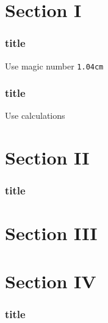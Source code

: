\documentclass[12pt]{beamer}
\begin{document}
\section{Section I}

{%
    \vspace*{-1.04cm}
    \begin{frame}
    \frametitle{title}
    {\Large Use magic number \texttt{1.04cm}}\par\lipsum[2]
    \end{frame}
}

{%
    \makeatletter
    \vspace*{-\dimexpr\headheight+\f@size pt\relax}
    \makeatother
    \begin{frame}
    \frametitle{title}
    {\Large Use calculations}\par\lipsum[2]
    \end{frame}
}

\section{Section II}
    \begin{frame}
    \frametitle{title}\par\lipsum[2]
    \end{frame}

\section{Section III}
\section{Section IV}
    \begin{frame}
    \frametitle{title}
    \end{frame}
\end{document}
